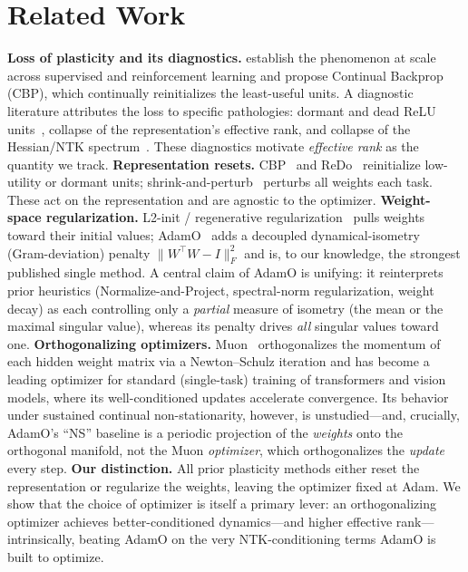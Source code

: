 \documentclass[letterpaper,twocolumn,10pt]{article}
\begin{document}
\section{Related Work}
\textbf{Loss of plasticity and its diagnostics.} \citet{dohare2024} establish the phenomenon at scale across supervised and reinforcement learning and propose Continual Backprop (CBP), which continually reinitializes the least-useful units. A diagnostic literature attributes the loss to specific pathologies: dormant and dead ReLU units~\citep{sokar2023}, collapse of the representation's effective rank, and collapse of the Hessian/NTK spectrum~\citep{spectralcollapse2025}. These diagnostics motivate \emph{effective rank} as the quantity we track. \textbf{Representation resets.} CBP~\citep{dohare2024} and ReDo~\citep{sokar2023} reinitialize low-utility or dormant units; shrink-and-perturb~\citep{ash2020} perturbs all weights each task. These act on the representation and are agnostic to the optimizer. \textbf{Weight-space regularization.} L2-init / regenerative regularization~\citep{kumar2023} pulls weights toward their initial values; AdamO~\citep{adamo2026} adds a decoupled dynamical-isometry (Gram-deviation) penalty $\|W^\top W-I\|_F^2$ and is, to our knowledge, the strongest published single method. A central claim of AdamO is unifying: it reinterprets prior heuristics (Normalize-and-Project, spectral-norm regularization, weight decay) as each controlling only a \emph{partial} measure of isometry (the mean or the maximal singular value), whereas its penalty drives \emph{all} singular values toward one. \textbf{Orthogonalizing optimizers.} Muon~\citep{muon2024} orthogonalizes the momentum of each hidden weight matrix via a Newton--Schulz iteration and has become a leading optimizer for standard (single-task) training of transformers and vision models, where its well-conditioned updates accelerate convergence. Its behavior under sustained continual non-stationarity, however, is unstudied---and, crucially, AdamO's ``NS'' baseline is a periodic projection of the \emph{weights} onto the orthogonal manifold, not the Muon \emph{optimizer}, which orthogonalizes the \emph{update} every step. \textbf{Our distinction.} All prior plasticity methods either reset the representation or regularize the weights, leaving the optimizer fixed at Adam. We show that the choice of optimizer is itself a primary lever: an orthogonalizing optimizer achieves better-conditioned dynamics---and higher effective rank---intrinsically, beating AdamO on the very NTK-conditioning terms AdamO is built to optimize.
\end{document}
